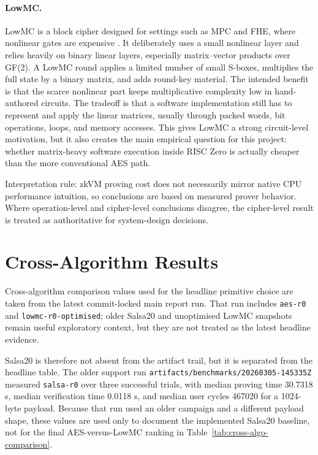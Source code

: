 \paragraph{LowMC.}
LowMC is a block cipher designed for settings such as MPC and FHE, where
nonlinear gates are expensive \cite{albrecht2015ciphers}. It deliberately uses a
small nonlinear layer and relies heavily on binary linear layers, especially
matrix--vector products over GF(2). A LowMC round applies a limited number of
small S-boxes, multiplies the full state by a binary matrix, and adds round-key
material. The intended benefit is that the scarce nonlinear part keeps
multiplicative complexity low in hand-authored circuits. The tradeoff is that a
software implementation still has to represent and apply the linear matrices,
usually through packed words, bit operations, loops, and memory accesses. This
gives LowMC a strong circuit-level motivation, but it also creates the main
empirical question for this project: whether matrix-heavy software execution
inside RISC Zero is actually cheaper than the more conventional AES path.

Interpretation rule: zkVM proving cost does not necessarily mirror native CPU
performance intuition, so conclusions are based on measured prover behavior.
Where operation-level and cipher-level conclusions disagree, the cipher-level
result is treated as authoritative for system-design decisions.

\section{Cross-Algorithm Results}

Cross-algorithm comparison values used for the headline primitive choice are
taken from the latest commit-locked main report run. That run includes
\texttt{aes-r0} and \texttt{lowmc-r0-optimised}; older Salsa20 and unoptimised
LowMC snapshots remain useful exploratory context, but they are not treated as
the latest headline evidence.

Salsa20 is therefore not absent from the artifact trail, but it is separated from
the headline table. The older support run
\texttt{artifacts/benchmarks/20260305-145335Z} measured \texttt{salsa-r0} over
three successful trials, with median proving time 30.7318 s, median verification
time 0.0118 s, and median user cycles 467020 for a 1024-byte payload. Because
that run used an older campaign and a different payload shape, these values are
used only to document the implemented Salsa20 baseline, not for the final
AES-versus-LowMC ranking in Table~\ref{tab:cross-algo-comparison}.

